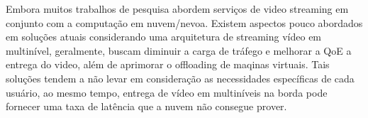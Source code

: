 
Embora muitos trabalhos de pesquisa abordem serviços de video streaming em conjunto com a computação em nuvem/nevoa. Existem aspectos pouco abordados em soluções atuais considerando uma arquitetura de streaming vídeo em multinível, geralmente, buscam diminuir a carga de tráfego e melhorar a QoE a entrega do video, além de aprimorar o offloading de maqinas virtuais.
Tais soluções tendem a não levar em consideração as necessidades específicas de cada usuário, ao mesmo tempo, entrega de vídeo em multiníveis na borda pode fornecer uma taxa de latência que a nuvem não consegue prover.



